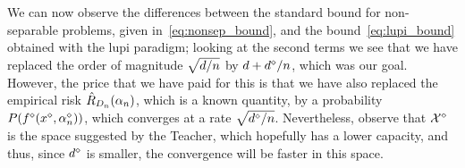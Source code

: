 
We can now observe the differences between the standard bound for non-separable problems, given in~\eqref{eq:nonsep_bound}, and the bound~\eqref{eq:lupi_bound} obtained with the \acrshort{lupi} paradigm; looking at the second terms we see that we have replaced the order of magnitude $\sqrt{d/n}$ by ${d + {d}^{\diamond}/n}$, which was our goal. However, the price that we have paid for this is that we have also replaced the empirical risk $\hat{R}_{D_{n}}(\alpha_n)$, which is a known quantity, by a probability $P({f}^{\diamond}({x}^{\diamond}, {\alpha}^{\diamond}_n))$, which converges at a rate $\sqrt{{d}^{\diamond}/n}$. 
%
Nevertheless, observe that ${\mathcal{X}}^{\diamond}$ is the space suggested by the Teacher, which hopefully has a lower capacity, and thus, since ${d}^{\diamond}$ is smaller, the convergence will be faster in this space.

